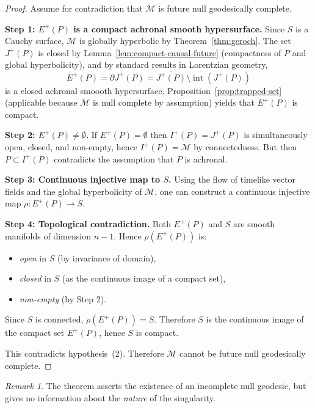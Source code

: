 \documentclass[12pt, a4paper]{article}
\theoremstyle{plain}
\theoremstyle{definition}
\theoremstyle{remark}
\newtheorem{remark}[theorem]{Remark}
\newcommand{\M}{\mathcal{M}}
\begin{document}
\begin{proof}
  Assume for contradiction that $\M$ is future null geodesically complete.

  \medskip\noindent\textbf{Step 1: $E^+(P)$ is a compact achronal
  smooth hypersurface.}
  Since $S$ is a Cauchy surface, $\M$ is globally hyperbolic by
  Theorem~\ref{thm:geroch}. The set $J^+(P)$ is closed by
  Lemma~\ref{lem:compact-causal-future} (compactness of $P$ and global
  hyperbolicity), and by standard results in Lorentzian geometry,
  \[
    E^+(P) = \partial J^+(P) = \overline{J^+(P)} \setminus
    \operatorname{int}(J^+(P))
  \]
  is a closed achronal smoooth hypersurface. Proposition~\ref{prop:trapped-set}
  (applicable because $\M$ is null complete by assumption) yields that
  $E^+(P)$ is compact.

  \medskip\noindent\textbf{Step 2: $E^+(P) \neq \emptyset$.}
  If $E^+(P) = \emptyset$ then $I^+(P) = J^+(P)$ is simultaneously
  open, closed, and non-empty, hence $I^+(P) = \M$ by connectedness.
  But then $P \subset I^+(P)$ contradicts the assumption that $P$ is achronal.

  \medskip\noindent\textbf{Step 3: Continuous injective map to $S$.}
  Using the flow of timelike vector fields and the global hyperbolicity
  of $\M$, one can construct a continuous injective map
  $\rho \colon E^+(P) \to S$.

  \medskip\noindent\textbf{Step 4: Topological contradiction.}
  Both $E^+(P)$ and $S$ are smooth manifolds of dimension $n-1$. Hence $\rho(E^+(P))$ is:
  \begin{itemize}
    \item \emph{open} in $S$ (by invariance of domain),
    \item \emph{closed} in $S$ (as the continuous image of a compact set),
    \item \emph{non-empty} (by Step 2).
  \end{itemize}
  Since $S$ is connected, $\rho(E^+(P)) = S$. Therefore $S$ is the
  continuous image of the compact set $E^+(P)$, hence $S$ is compact.

  This contradicts hypothesis~(2). Therefore $\M$ cannot be future
  null geodesically complete.
\end{proof}

\begin{remark}
  The theorem asserts the existence of an incomplete null geodesic,
  but gives no information about the \emph{nature} of the singularity.
\end{remark}

\printbibliography
\end{document}
